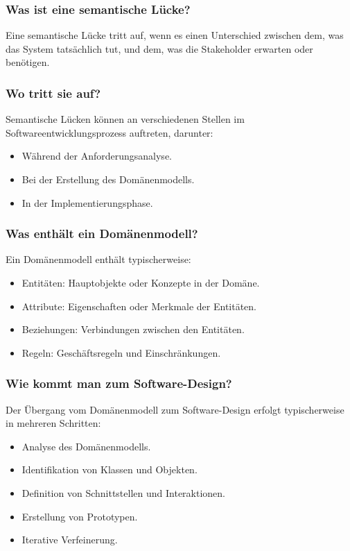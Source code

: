 \documentclass[main.tex]{subfiles}
\begin{document}
\subsubsection*{Was ist eine \gls{semantische Lücke}?}
Eine \gls{semantische Lücke} tritt auf, wenn es einen Unterschied zwischen dem, was das System tatsächlich tut, und dem, was die Stakeholder erwarten oder benötigen.


\subsubsection*{Wo tritt sie auf?}
Semantische Lücken können an verschiedenen Stellen im Softwareentwicklungsprozess auftreten, darunter:
\begin{itemize}
    \item Während der Anforderungsanalyse.
    \item Bei der Erstellung des \gls{Domänenmodell}s.
    \item In der Implementierungsphase.
\end{itemize}

\subsubsection*{Was enthält ein \gls{Domänenmodell}?}
Ein \gls{Domänenmodell} enthält typischerweise:
\begin{itemize}
    \item Entitäten: Hauptobjekte oder Konzepte in der Domäne.
    \item Attribute: Eigenschaften oder Merkmale der Entitäten.
    \item Beziehungen: Verbindungen zwischen den Entitäten.
    \item Regeln: Geschäftsregeln und Einschränkungen.
\end{itemize}

\subsubsection*{Wie kommt man zum Software-Design?}
Der Übergang vom \gls{Domänenmodell} zum Software-Design erfolgt typischerweise in mehreren Schritten:
\begin{itemize}
    \item Analyse des \gls{Domänenmodell}s.
    \item Identifikation von Klassen und Objekten.
    \item Definition von Schnittstellen und Interaktionen.
    \item Erstellung von Prototypen.
    \item Iterative Verfeinerung.
\end{itemize}
\end{document}
